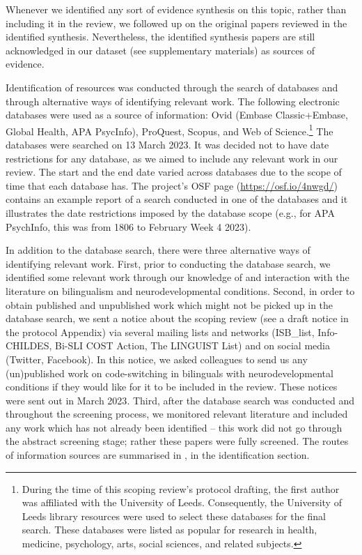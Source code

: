 \documentclass[output=paper]{langscibook}
\begin{document}
Whenever we identified any sort of evidence synthesis on this topic, rather than including it in the review, we followed up on the original papers reviewed in the identified synthesis. Nevertheless, the identified synthesis papers are still acknowledged in our dataset (see supplementary materials) as sources of evidence.

Identification of resources was conducted through the search of databases and through alternative ways of identifying relevant work. The following electronic databases were used as a source of information: Ovid (Embase Classic+Embase, Global Health, APA PsycInfo), ProQuest, Scopus, and Web of Science.\footnote{During the time of this scoping review’s protocol drafting, the first author was affiliated with the University of Leeds. Consequently, the University of Leeds library resources were used to select these databases for the final search. These databases were listed as popular for research in health, medicine, psychology, arts, social sciences, and related subjects.} The databases were searched on 13  {March 2023}. It was decided not to have date restrictions for any database, as we aimed to include any relevant work in our review. The start and the end date varied across databases due to the scope of time that each database has. The project's OSF page (\url{https://osf.io/4nwgd/}) contains an example report of a search conducted in one of the databases and it illustrates the date restrictions imposed by the database scope (e.g., for APA PsychInfo, this was from 1806 to February Week 4 2023).

In addition to the database search, there were three alternative ways of identifying relevant work. First, prior to conducting the database search, we identified some relevant work through our knowledge of and interaction with the literature on bilingualism and neurodevelopmental conditions. Second, in order to obtain published and unpublished work which might not be picked up in the database search, we sent a notice about the scoping review (see a draft notice in the protocol Appendix) via several mailing lists and networks (ISB\_list, Info-CHILDES, Bi-SLI COST Action, The LINGUIST List) and on social media (Twitter, Facebook). In this notice, we asked colleagues to send us any (un)published work on code-switching in bilinguals with neurodevelopmental conditions if they would like for it to be included in the review. These notices were sent out in  {March 2023}. Third, after the database search was conducted and throughout the screening process, we monitored relevant literature and included any work which has not already been identified -- this work did not go through the abstract screening stage; rather these papers were fully screened. The routes of information sources are summarised in , in the identification section.
\end{document}
